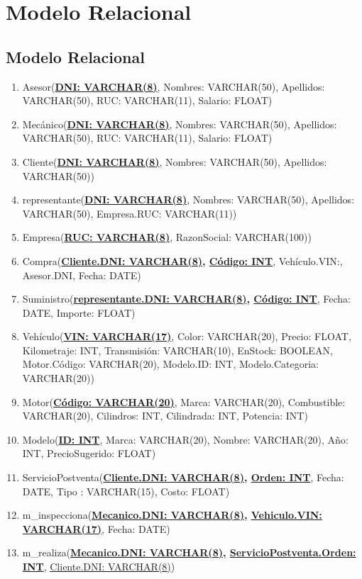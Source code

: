 \documentclass[12pt]{article}
\begin{document}
\section{Modelo Relacional}

\subsection{Modelo Relacional}
\begin{enumerate}
\item Asesor(\textbf{\underline{DNI: VARCHAR(8)}}, Nombres: VARCHAR(50), Apellidos: VARCHAR(50), RUC: VARCHAR(11), Salario: FLOAT)
\item Mecánico(\textbf{\underline{DNI: VARCHAR(8)}}, Nombres: VARCHAR(50), Apellidos: VARCHAR(50), RUC: VARCHAR(11), Salario: FLOAT)
\item Cliente(\textbf{\underline{DNI: VARCHAR(8)}}, Nombres: VARCHAR(50), Apellidos: VARCHAR(50))
\item representante(\textbf{\underline{DNI: VARCHAR(8)}}, Nombres: VARCHAR(50), Apellidos: VARCHAR(50), Empresa.RUC: VARCHAR(11))
\item Empresa(\textbf{\underline{RUC: VARCHAR(8)}}, RazonSocial: VARCHAR(100))
\item Compra(\textbf{\underline{Cliente.DNI: VARCHAR(8)}, \underline{Código: INT}}, Vehículo.VIN:, Asesor.DNI, Fecha: DATE)
\item Suministro(\textbf{\underline{representante.DNI: VARCHAR(8)}, \underline{Código: INT}}, Fecha: DATE, Importe: FLOAT)
\item Vehículo(\textbf{\underline{VIN: VARCHAR(17)}}, Color: VARCHAR(20), Precio: FLOAT, Kilometraje: INT, Transmisión: VARCHAR(10), EnStock: BOOLEAN, Motor.Código: VARCHAR(20), Modelo.ID: INT, Modelo.Categoria: VARCHAR(20))
\item Motor(\textbf{\underline{Código: VARCHAR(20)}}, Marca: VARCHAR(20), Combustible: VARCHAR(20), Cilindros: INT, Cilindrada: INT, Potencia: INT)
\item Modelo(\textbf{\underline{ID: INT}}, Marca: VARCHAR(20), Nombre: VARCHAR(20), Año: INT, PrecioSugerido: FLOAT)
\item ServicioPostventa(\textbf{\underline{Cliente.DNI: VARCHAR(8)}, \underline{Orden: INT}}, Fecha: DATE, Tipo : VARCHAR(15), Costo: FLOAT)
\item m\_inspecciona(\textbf{\underline{Mecanico.DNI: VARCHAR(8)}, \underline{Vehiculo.VIN: VARCHAR(17)}}, Fecha: DATE)
\item m\_realiza(\textbf{\underline{Mecanico.DNI: VARCHAR(8)}, \underline{ServicioPostventa.Orden: INT}}, \underline{Cliente.DNI: VARCHAR(8)})
\end{enumerate}
\end{document}
